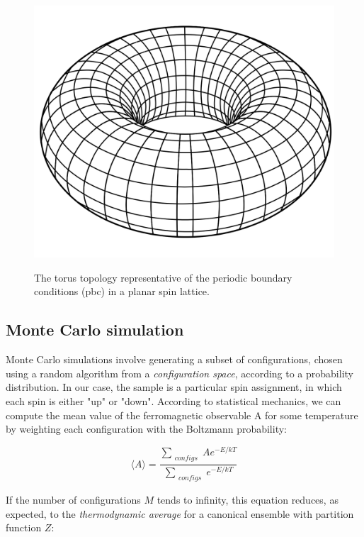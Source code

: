 \documentclass[a4paper]{article}
\begin{document}
\begin{figure}[h]
\begin{minipage}[b]{0.4\linewidth}
\includegraphics[width=1\textwidth]{torus.png}
\label{fig:minipage2}
\caption{The torus topology representative of the periodic boundary conditions (pbc) in a planar spin lattice.}
\end{minipage}
\end{figure}


\subsection{Monte Carlo simulation}

Monte Carlo simulations involve generating a subset of configurations, chosen using a random algorithm from a \textit{configuration space}, according to a probability distribution\cite{mcs}. In our case, the sample is a particular spin assignment, in which each spin is either "up" or "down". According to statistical mechanics, we can compute the mean value of the ferromagnetic observable A for some temperature by weighting each configuration with the Boltzmann probability:

\begin{equation}
\langle A \rangle = \frac{\sum_{\substack{ configs}} A e^{-E/kT}}{\sum_{\substack{ configs}}  e^{-E/kT}}
\end{equation}

If the number of configurations $M$ tends to infinity, this equation reduces, as expected, to the \textit{thermodynamic average} for a canonical ensemble with partition function $Z$:
\end{document}
